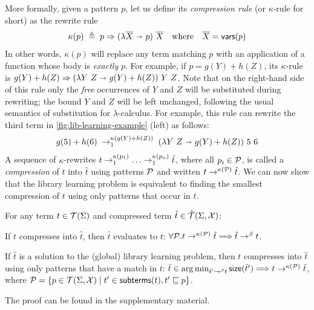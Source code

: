 %
More formally, given a pattern $p$,
let us define its \emph{compression rule} (or $\kappa$-rule for short)
as the rewrite rule
\[
  \kappa(p) \; \triangleq \; p \Rightarrow (\lambda \overline{X} \ \mathbf{\shortrightarrow}\  p)\ \overline{X} \quad \text{where}\quad \overline{X} = \mathsf{vars}(p)
\]
%
In other words, $\kappa(p)$ will replace any term 
matching $p$ with an application of a function whose body is \emph{exactly} $p$.
%
For example, if $p = g(Y) + h(Z)$,
its $\kappa$-rule is $g(Y) + h(Z) \Rightarrow (\lambda Y\ Z \ \mathbf{\shortrightarrow}\  g(Y) + h(Z))\ Y\ Z$.
%
Note that on the right-hand side of this rule 
only the \emph{free} occurrences of $Y$ and $Z$ will be substituted during rewriting;
the bound $Y$ and $Z$ will be left unchanged, following the usual semantics of substitution for $\lambda$-calculus.
%
For example, this rule can rewrite the third term in \autoref{fig:lib-learning-example} (left) as follows:
\[
  g(5) + h(6) \;\rwsteps{\kappa(g(Y) + h(Z))}\; (\lambda Y\ Z \bnd g(Y) + h(Z))\ 5\ 6
\]
%
%
A sequence of $\kappa$-rewrites $t \rwsteps{\kappa(p_1)} \dots \rwsteps{\kappa(p_n)} \hat{t}$,
where all $p_i \in \mathcal{P}$, 
is called a \emph{compression} of $t$ into $\hat{t}$ using patterns $\mathcal{P}$
and written $t \rightarrow^{\kappa(\mathcal{P})} \hat{t}$.
%
We can now show that the library learning problem is equivalent to finding the smallest compression of $t$
using only patterns that occur in $t$.

\begin{theorem}
  For any term $t \in \mathcal{T}(\Sigma)$ and compressed term $\hat{t} \in \hat{\mathcal{T}}(\Sigma,\mathcal{X})$:
  \begin{description}[font=\itshape]
    \item[(Soundness)] If $t$ compresses into $\hat{t}$, then $\hat{t}$ evaluates to $t$: $\forall \mathcal{P} . t \rightarrow^{\kappa(\mathcal{P})} \hat{t} \Longrightarrow \hat{t} \rightarrow^{\beta} t$.
    \item[(Completeness)] If $\hat{t}$ is a solution to the (global) library learning problem, 
    then $t$ compresses into $\hat{t}$ using only patterns that have a match in $t$:
    $\hat{t} \in \operatorname*{arg\,min}_{\hat{t}' \rightarrow^{\beta} t} \mathsf{size}(\hat{t}') \Longrightarrow t \rightarrow^{\kappa(\mathcal{P})} \hat{t}$, 
    where $\mathcal{P} = \{p \in \mathcal{T}(\Sigma,\mathcal{X}) \mid t' \in \mathsf{subterms}(t) , t' \sqsubseteq p\}$.
  \end{description}
\label{thm:pat-lib-learning}
\end{theorem} 
%
The proof can be found in the supplementary material. %

